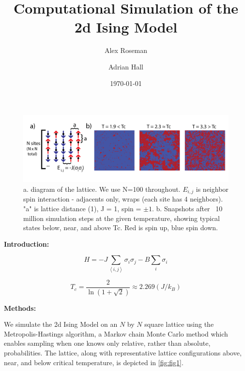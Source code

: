 \documentclass[letter,scriptaddress,twocolumn, prl]{revtex4}
\begin{document}
\title{Computational Simulation of the 2d Ising Model}

\author{Alex Roseman}
\author{Adrian Hall}
\date{\today}

\begin{abstract}

\end{abstract}

\maketitle

\begin{figure}[t]
	\begin{center}
		\includegraphics[width=1\textwidth]{figs/fig1.png}
		\caption{a. diagram of the lattice. We use N=100 throughout. $E_{i, j}$ is neighbor spin interaction - adjacents only, wraps (each site has 4 neighbors). "a" is lattice distance (1), J = 1, spin = $\pm 1$. b. Snapshots after ~10 million simulation steps at the given temperature, showing typical states below, near, and above Tc. Red is spin up, blue spin down.}
		\label{fig:fig1}
	\end{center}
\end{figure}

\textbf{Introduction:}

\begin{equation}
	\label{eq:hamiltonian}
	H = -J \sum_{\left\langle i, j \right\rangle}\sigma_i\sigma_j - B \sum_i\sigma_i
\end{equation}

\begin{equation}
	\label{eq:Tc}
	T_c = \frac{2}{\ln{(1+\sqrt{2})}} \approx 2.269 (J/k_B)
\end{equation}

\textbf{Methods:}

We simulate the 2d Ising Model on an $N$ by $N$ square lattice using the Metropolis-Hastings algorithm, a Markov chain Monte Carlo method which enables sampling when one knows only relative, rather than absolute, probabilities. The lattice, along with representative lattice configurations above, near, and below critical temperature, is depicted in \autoref{fig:fig1}.
\end{document}

